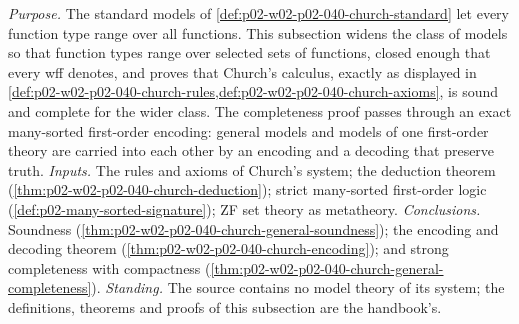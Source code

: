 \emph{Purpose.}  The standard models of
\cref{def:p02-w02-p02-040-church-standard} let every function type range
over all functions.  This subsection widens the class of models so that
function types range over selected sets of functions, closed enough that
every wff denotes, and proves that Church's calculus, exactly as displayed
in \cref{def:p02-w02-p02-040-church-rules,def:p02-w02-p02-040-church-axioms},
is sound and complete for the wider class.  The completeness proof passes
through an exact many-sorted first-order encoding: general models and
models of one first-order theory are carried into each other by an encoding
and a decoding that preserve truth.
\emph{Inputs.}  The rules and axioms of Church's system; the deduction
theorem (\cref{thm:p02-w02-p02-040-church-deduction}); strict many-sorted
first-order logic (\cref{def:p02-many-sorted-signature}); ZF set theory as
metatheory.
\emph{Conclusions.}  Soundness
(\cref{thm:p02-w02-p02-040-church-general-soundness}); the encoding and
decoding theorem (\cref{thm:p02-w02-p02-040-church-encoding}); and strong
completeness with compactness
(\cref{thm:p02-w02-p02-040-church-general-completeness}).
\emph{Standing.}  The source contains no model theory of its system; the
definitions, theorems and proofs of this subsection are the handbook's.

